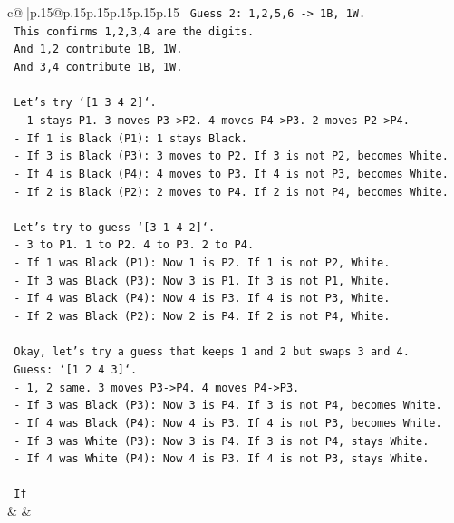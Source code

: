 \documentclass{article}
\begin{document}
{\begin{supertabular}{c@{$\;$}|p{.15\linewidth}@{}p{.15\linewidth}p{.15\linewidth}p{.15\linewidth}p{.15\linewidth}p{.15\linewidth}}
{{{\texttt{    Guess 2: 1,2,5,6 {-}> 1B, 1W.} \\
\texttt{    This confirms 1,2,3,4 are the digits.} \\
\texttt{    And 1,2 contribute 1B, 1W.} \\
\texttt{    And 3,4 contribute 1B, 1W.} \\
\\ 
\texttt{    Let's try `{[}1 3 4 2{]}`.} \\
\texttt{    {-} 1 stays P1. 3 moves P3{-}>P2. 4 moves P4{-}>P3. 2 moves P2{-}>P4.} \\
\texttt{    {-} If 1 is Black (P1): 1 stays Black.} \\
\texttt{    {-} If 3 is Black (P3): 3 moves to P2. If 3 is not P2, becomes White.} \\
\texttt{    {-} If 4 is Black (P4): 4 moves to P3. If 4 is not P3, becomes White.} \\
\texttt{    {-} If 2 is Black (P2): 2 moves to P4. If 2 is not P4, becomes White.} \\
\\ 
\texttt{    Let's try to guess `{[}3 1 4 2{]}`.} \\
\texttt{    {-} 3 to P1. 1 to P2. 4 to P3. 2 to P4.} \\
\texttt{    {-} If 1 was Black (P1): Now 1 is P2. If 1 is not P2, White.} \\
\texttt{    {-} If 3 was Black (P3): Now 3 is P1. If 3 is not P1, White.} \\
\texttt{    {-} If 4 was Black (P4): Now 4 is P3. If 4 is not P3, White.} \\
\texttt{    {-} If 2 was Black (P2): Now 2 is P4. If 2 is not P4, White.} \\
\\ 
\texttt{    Okay, let's try a guess that keeps 1 and 2 but swaps 3 and 4.} \\
\texttt{    Guess: `{[}1 2 4 3{]}`.} \\
\texttt{    {-} 1, 2 same. 3 moves P3{-}>P4. 4 moves P4{-}>P3.} \\
\texttt{    {-} If 3 was Black (P3): Now 3 is P4. If 3 is not P4, becomes White.} \\
\texttt{    {-} If 4 was Black (P4): Now 4 is P3. If 4 is not P3, becomes White.} \\
\texttt{    {-} If 3 was White (P3): Now 3 is P4. If 3 is not P4, stays White.} \\
\texttt{    {-} If 4 was White (P4): Now 4 is P3. If 4 is not P3, stays White.} \\
\\ 
\texttt{    If} \\
            }
        }
    }
    & & \\ \\


\end{supertabular}}
\end{document}
